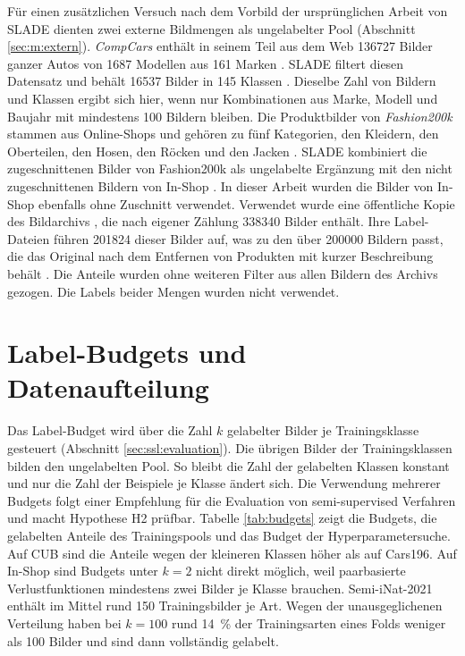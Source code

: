Für einen zusätzlichen Versuch nach dem Vorbild der ursprünglichen Arbeit von \ac{SLADE} dienten zwei externe Bildmengen als ungelabelter Pool (Abschnitt \ref{sec:m:extern}). \emph{CompCars} enthält in seinem Teil aus dem Web \num{136727} Bilder ganzer Autos von \num{1687} Modellen aus 161 Marken \cite{yang_large-scale_2015}. \ac{SLADE} filtert diesen Datensatz und behält \num{16537} Bilder in 145 Klassen \cite{duan_slade_2021}. Dieselbe Zahl von Bildern und Klassen ergibt sich hier, wenn nur Kombinationen aus Marke, Modell und Baujahr mit mindestens 100 Bildern bleiben. Die Produktbilder von \emph{Fashion200k} stammen aus Online-Shops und gehören zu fünf Kategorien, den Kleidern, den Oberteilen, den Hosen, den Röcken und den Jacken \cite{han_automatic_2017}. \ac{SLADE} kombiniert die zugeschnittenen Bilder von Fashion200k als ungelabelte Ergänzung mit den nicht zugeschnittenen Bildern von In-Shop \cite{duan_slade_2021}. In dieser Arbeit wurden die Bilder von In-Shop ebenfalls ohne Zuschnitt verwendet. Verwendet wurde eine öffentliche Kopie des Bildarchivs \cite{bhattacharyya_fashion-200k_2020}, die nach eigener Zählung \num{338340} Bilder enthält. Ihre Label-Dateien führen \num{201824} dieser Bilder auf, was zu den über \num{200000} Bildern passt, die das Original nach dem Entfernen von Produkten mit kurzer Beschreibung behält \cite{han_automatic_2017}. Die Anteile wurden ohne weiteren Filter aus allen Bildern des Archivs gezogen. Die Labels beider Mengen wurden nicht verwendet.

\section{Label-Budgets und Datenaufteilung}
\label{sec:budgets}

Das Label-Budget wird über die Zahl $k$ gelabelter Bilder je Trainingsklasse gesteuert (Abschnitt \ref{sec:ssl:evaluation}). Die übrigen Bilder der Trainingsklassen bilden den ungelabelten Pool. So bleibt die Zahl der gelabelten Klassen konstant und nur die Zahl der Beispiele je Klasse ändert sich. Die Verwendung mehrerer Budgets folgt einer Empfehlung für die Evaluation von semi-supervised Verfahren \cite{oliver_realistic_2018} und macht Hypothese H2 prüfbar. Tabelle \ref{tab:budgets} zeigt die Budgets, die gelabelten Anteile des Trainingspools und das Budget der Hyperparametersuche. Auf \ac{CUB} sind die Anteile wegen der kleineren Klassen höher als auf Cars196. Auf In-Shop sind Budgets unter $k=2$ nicht direkt möglich, weil paarbasierte Verlustfunktionen mindestens zwei Bilder je Klasse brauchen. Semi-iNat-2021 enthält im Mittel rund 150 Trainingsbilder je Art. Wegen der unausgeglichenen Verteilung haben bei $k=100$ rund \SI{14}{\percent} der Trainingsarten eines Folds weniger als 100 Bilder und sind dann vollständig gelabelt.

